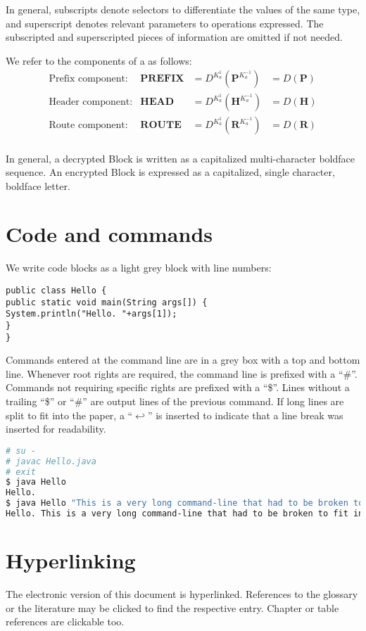 In general, subscripts denote selectors to differentiate the values of the same type, and superscript denotes relevant parameters to operations expressed. The subscripted and superscripted pieces of information are omitted if not needed.

We refer to the components of a \VortexMessage as follows:
\begin{align*}
\text{Prefix component:}         & \mathbf{PREFIX}                 &=D^{K^{1}_a}\left(\mathbf{P}^{K^{-1}_a}\right) &=D\left(\mathbf{P}\right)\\
\text{Header component:}         & \mathbf{HEAD}                 &=D^{K^{1}_a}\left(\mathbf{H}^{K^{-1}_a}\right) &=D\left(\mathbf{H}\right)\\
\text{Route component:}         & \mathbf{ROUTE}                 &=D^{K^{1}_a}\left(\mathbf{R}^{K^{-1}_a}\right) &=D\left(\mathbf{R}\right)\\
\end{align*}

In general, a decrypted Block is written as a capitalized multi-character boldface sequence. An encrypted Block is expressed as a capitalized, single character, boldface letter.

\section{Code and commands}
We write code blocks as a light grey block with line numbers:

\begin{lstlisting}
public class Hello {
public static void main(String args[]) {
System.println("Hello. "+args[1]);
}
}
\end{lstlisting}

Commands entered at the command line are in a grey box with a top and bottom line. Whenever root rights are required, the command line is prefixed with a ``\#''. Commands not requiring specific rights are prefixed with a ``\$''. Lines without a trailing ``\$'' or ``\#'' are output lines of the previous command. If long lines are split to fit into the paper, a ``$\hookleftarrow$'' is inserted to indicate that a line break was inserted for readability.

\begin{lstlisting}[language=bash]
# su -
# javac Hello.java 
# exit
$ java Hello
Hello.
$ java Hello "This is a very long command-line that had to be broken to fit into the code box displayed on this page."
Hello. This is a very long command-line that had to be broken to fit into the code box displayed on this page.
\end{lstlisting}

\section{Hyperlinking}
The electronic version of this document is hyperlinked. References to the glossary or the literature may be clicked to find the respective entry. Chapter or table references are clickable too. 


